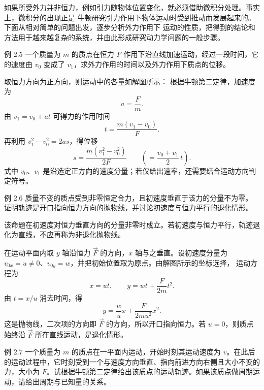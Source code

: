 如果所受外力并非恒力，例如引力随物体位置变化，就必须借助微积分处理。事实上，微积分的出现正是
牛顿研究引力作用下物体运动时受到推动而发展起来的。下面从相对简单的问题出发，逐步分析外力作用下
运动的性质，把得到的结论和方法用于越来越复杂的系统，并由此形成研究动力学问题的一般步骤。

\begin{origexamplebox}{例 2.5}
一个质量为 $m$ 的质点在恒力 $F$ 作用下沿直线加速运动，经过一段时间，它的速度由 $v_0$
变成了 $v_1$，求外力作用的时间以及外力作用下质点的位移。
\end{origexamplebox}

\begin{xesolution}
取恒力方向为正方向，则运动中的各量如解图所示：
\soldiagTwoFive
根据牛顿第二定律，加速度为
\[
  a=\frac{F}{m}.
\]
由 $v_1=v_0+at$ 可得力的作用时间
\[
  \boxed{t=\frac{m(v_1-v_0)}{F}}.
\]
再利用 $v_1^2-v_0^2=2as$，得位移
\[
  \boxed{s=\frac{m(v_1^2-v_0^2)}{2F}}
  \qquad
  \left(=\frac{v_0+v_1}{2}\,t\right).
\]
式中 $v_0$、$v_1$ 是沿选定正方向的速度分量；若仅给出速率，还需要结合运动方向判定符号。
\end{xesolution}

\begin{origexamplebox}{例 2.6}
质量不变的质点受到非零恒定合力，且初速度垂直于该力的分量不为零。
证明轨迹是开口指向恒力方向的抛物线，并讨论初速度与恒力平行的退化情形。
\end{origexamplebox}

\begin{xesolution}
该命题在初速度对恒力垂直方向的分量非零时成立。若初速度与恒力平行，轨迹退化为直线，不应再称为非退化抛物线。

在运动平面内取 $y$ 轴沿恒力 $\vec F$ 的方向，$x$ 轴与之垂直。设初速度分量为 $v_{0x}=u\ne0$、$v_{0y}=w$，并把初始位置取为原点。由解图所示的坐标选择，
\soldiagTwoSix
运动方程为
\[
  x=ut,
  \qquad
  y=wt+\frac{F}{2m}t^2.
\]
由 $t=x/u$ 消去时间，得
\[
  \boxed{y=\frac wu x+\frac{F}{2mu^2}x^2}.
\]
这是抛物线，二次项的方向即 $\vec F$ 的方向，所以开口指向恒力。若 $u=0$，则质点始终沿 $\vec F$ 所在直线运动，是退化情形。
\end{xesolution}

\begin{origexamplebox}{例 2.7}
一个质量为 $m$ 的质点在一平面内运动，开始时刻其运动速度为 $v$。在此后的运动过程中，它时刻受到一个与速度方向垂直、指向前进方向右侧且大小不变的力，大小为 $F$。试根据牛顿第二定律给出该质点的运动轨迹。如果该质点做周期运动，请给出周期与已知量的关系。
\end{origexamplebox}

